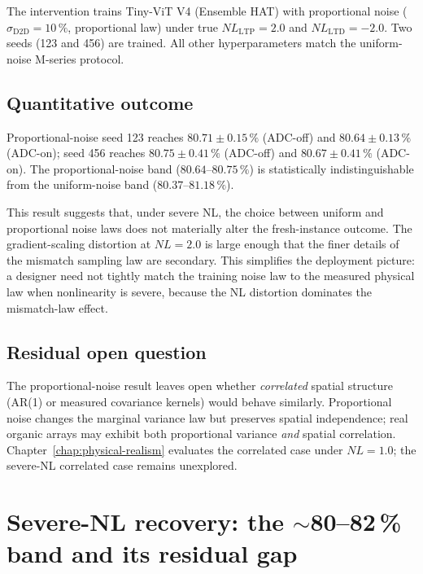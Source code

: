 The intervention trains Tiny-ViT V4 (Ensemble HAT) with proportional noise ($\sigma_{\mathrm{D2D}}=10\,\%$, proportional law) under true $NL_{\mathrm{LTP}}=2.0$ and $NL_{\mathrm{LTD}}=-2.0$.  Two seeds (123 and 456) are trained.  All other hyperparameters match the uniform-noise M-series protocol.

\subsection{Quantitative outcome}

Proportional-noise seed 123 reaches $80.71\pm0.15\,\%$ (ADC-off) and $80.64\pm0.13\,\%$ (ADC-on); seed 456 reaches $80.75\pm0.41\,\%$ (ADC-off) and $80.67\pm0.41\,\%$ (ADC-on).  The proportional-noise band ($80.64$--$80.75\,\%$) is statistically indistinguishable from the uniform-noise band ($80.37$--$81.18\,\%$).

This result suggests that, under severe NL, the choice between uniform and proportional noise laws does not materially alter the fresh-instance outcome.  The gradient-scaling distortion at $NL=2.0$ is large enough that the finer details of the mismatch sampling law are secondary.  This simplifies the deployment picture: a designer need not tightly match the training noise law to the measured physical law when nonlinearity is severe, because the NL distortion dominates the mismatch-law effect.

\subsection{Residual open question}

The proportional-noise result leaves open whether \emph{correlated} spatial structure (AR(1) or measured covariance kernels) would behave similarly.  Proportional noise changes the marginal variance law but preserves spatial independence; real organic arrays may exhibit both proportional variance \emph{and} spatial correlation.  Chapter~\ref{chap:physical-realism} evaluates the correlated case under $NL=1.0$; the severe-NL correlated case remains unexplored.


\section{Severe-NL recovery: the \texorpdfstring{$\sim$80--82\,\%}{~80--82\%} band and its residual gap}
\label{sec:severe-nl-band}

